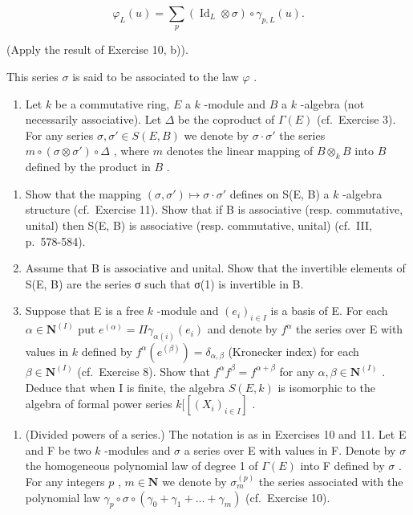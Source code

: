 \[
\varphi_ {L} (u) = \sum_ {p} \left(\operatorname{Id} _ {L} \otimes \sigma\right) \circ \gamma_ {p, L} (u). \tag {ii}
\]

(Apply the result of Exercise 10, b)).

This series \(\sigma\) is said to be associated to the law \(\varphi\) .

\begin{enumerate}
\def\labelenumi{\arabic{enumi})}
\setcounter{enumi}{11}
\tightlist
\item
  Let \(k\) be a commutative ring, \(E\) a \(k\) -module and \(B\) a \(k\) -algebra (not necessarily associative). Let \(\Delta\) be the coproduct of \(\Gamma(E)\) (cf.~Exercise 3). For any series \(\sigma, \sigma' \in S(E, B)\) we denote by \(\sigma \cdot \sigma'\) the series \(m \circ (\sigma \otimes \sigma') \circ \Delta\) , where \(m\) denotes the linear mapping of \(B \otimes_k B\) into \(B\) defined by the product in \(B\) .
\end{enumerate}

\begin{enumerate}
\def\labelenumi{\alph{enumi})}
\item
  Show that the mapping \((\sigma, \sigma') \mapsto \sigma \cdot \sigma'\) defines on S(E, B) a \(k\) -algebra structure (cf.~Exercise 11). Show that if B is associative (resp. commutative, unital) then S(E, B) is associative (resp. commutative, unital) (cf.~III, p.~578-584).
\item
  Assume that B is associative and unital. Show that the invertible elements of S(E, B) are the series σ such that σ(1) is invertible in B.
\item
  Suppose that E is a free \(k\) -module and \((e_i)_{i \in I}\) is a basis of E. For each \(\alpha \in \mathbf{N}^{(I)}\) put \(e^{(\alpha)} = \Pi \gamma_{\alpha(i)}(e_i)\) and denote by \(f^\alpha\) the series over E with values in \(k\) defined by \(f^\alpha(e^{(\beta)}) = \delta_{\alpha, \beta}\) (Kronecker index) for each \(\beta \in \mathbf{N}^{(I)}\) (cf.~Exercise 8). Show that \(f^\alpha f^\beta = f^{\alpha + \beta}\) for any \(\alpha, \beta \in \mathbf{N}^{(I)}\) . Deduce that when I is finite, the algebra \(S(E, k)\) is isomorphic to the algebra of formal power series \(k[[(X_i)_{i \in I}]\) .
\end{enumerate}

\begin{enumerate}
\def\labelenumi{\arabic{enumi})}
\setcounter{enumi}{12}
\tightlist
\item
  (Divided powers of a series.) The notation is as in Exercises 10 and 11. Let E and F be two \(k\) -modules and \(\sigma\) a series over E with values in F. Denote by \(\sigma\) the homogeneous polynomial law of degree 1 of \(\Gamma(E)\) into F defined by \(\sigma\) . For any integers \(p\) , \(m \in \mathbf{N}\) we denote by \(\sigma_m^{(p)}\) the series associated with the polynomial law \(\gamma_p \circ \sigma \circ (\gamma_0 + \gamma_1 + \ldots + \gamma_m)\) (cf.~Exercise 10).
\end{enumerate}

